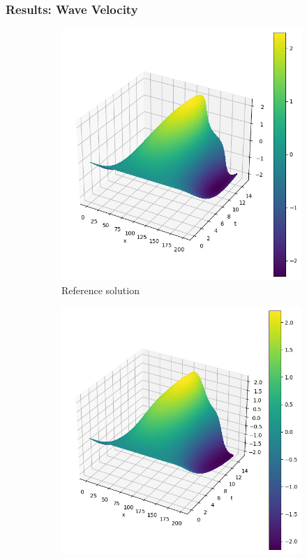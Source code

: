 \begin{frame}
    \frametitle{Results: Wave Velocity}

    \begin{figure}
        \centering
        \begin{subfigure}[b]{0.45\textwidth}
            \centering
            \includegraphics[width=\textwidth]{images/homogeneous_swe_pseudospectral_velocity.png}
            \caption{Reference solution}
            \label{fig:10_homogeneous_pseudospectral_swe_velocity}
        \end{subfigure}
        \hfill
        \begin{subfigure}[b]{0.45\textwidth}
            \centering
            \includegraphics[width=\textwidth]{images/homogeneous_swe_pinn_velocity.png}

\end{subfigure}
\end{figure}
\end{frame}

